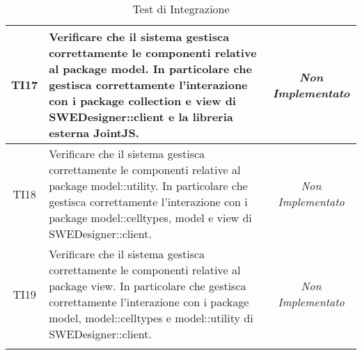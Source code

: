 \begin{longtable}{|c|>{}m{8cm}|c|}
\hypertarget{TI17}{TI17} & Verificare che il sistema gestisca correttamente le componenti relative al package model. In particolare che gestisca correttamente l'interazione con i package collection e view di SWEDesigner::client e la libreria esterna JointJS. & \textit{Non Implementato}\\ \hline
\hypertarget{TI18}{TI18} & Verificare che il sistema gestisca correttamente le componenti relative al package model::utility. In particolare che gestisca correttamente l'interazione con i package model::celltypes, model e view di SWEDesigner::client. & \textit{Non Implementato}\\ \hline
\hypertarget{TI19}{TI19} & Verificare che il sistema gestisca correttamente le componenti relative al package view. In particolare che gestisca correttamente l'interazione con i package model, model::celltypes e model::utility di SWEDesigner::client. & \textit{Non Implementato}\\ \hline
\caption[Test di Integrazione]{Test di Integrazione}
\label{tabella:test2}
\end{longtable}

